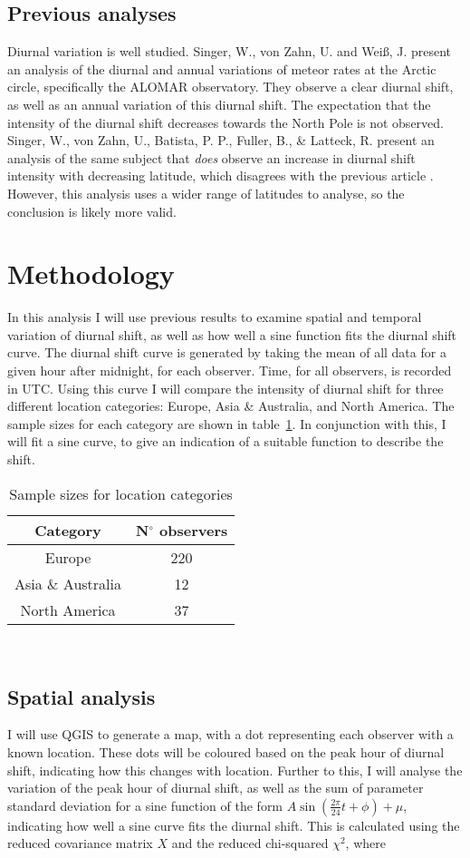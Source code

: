 \subsection{Previous analyses}
\label{sec:dishift:litrev}
Diurnal variation is well studied. Singer, W., von Zahn, U. and Wei{\ss}, J. present an analysis \cite{alomar} of the diurnal and annual variations of meteor rates at the Arctic circle, specifically the ALOMAR observatory. They observe a clear diurnal shift, as well as an annual variation of this diurnal shift. The expectation that the intensity of the diurnal shift decreases towards the North Pole is not observed. \\
Singer, W., von Zahn, U., Batista, P. P., Fuller, B., \& Latteck, R. present an analysis \cite{latitudes} of the same subject that {\it does} observe an increase in diurnal shift intensity with decreasing latitude, which disagrees with the previous article \cite{alomar}. However, this analysis uses a wider range of latitudes to analyse, so the conclusion is likely more valid.
\section{Methodology}
In this analysis I will use previous results to examine spatial and temporal variation of diurnal shift, as well as how well a sine function fits the diurnal shift curve.
The diurnal shift curve is generated by taking the mean of all data for a given hour after midnight, for each observer. Time, for all observers, is recorded in UTC. Using this curve I will compare the intensity of diurnal shift for three different location categories: Europe, Asia \& Australia, and North America. The sample sizes for each category are shown in table~\ref{tab:dishift:spatial}. In conjunction with this, I will fit a sine curve, to give an indication of a suitable function to describe the shift.
\begin{table}
	\begin{tabular}{cc}
		\hline
		Category & N$^{\circ}$ observers \\ \hline
		Europe & 220 \\
		Asia \& Australia & 12 \\
		North America & 37 \\
		\hline
	\end{tabular}
	\caption{Sample sizes for location categories
		\label{tab:dishift:spatial}}
\end{table}\\
\subsection{Spatial analysis}
I will use QGIS \cite{qgis} to generate a map, with a dot representing each observer with a known location. These dots will be coloured based on the peak hour of diurnal shift, indicating how this changes with location. Further to this, I will analyse the variation of the peak hour of diurnal shift, as well as the sum of parameter standard deviation for a sine function of the form $A \sin \left( \frac{2\pi}{24} t + \phi \right) + \mu$, indicating how well a sine curve fits the diurnal shift. This is calculated 
using the reduced covariance matrix $X$ and the reduced 
chi-squared $\chi^2$, where

